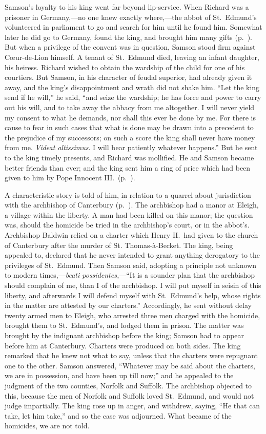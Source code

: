 \documentclass[10pt]{book}
\begin{document}
{Samson's loyalty to his king went far beyond lip-service. When Richard was a prisoner in Germany,---no one knew exactly where,---the abbot of St.\ Edmund's volunteered in parliament to go and search for him until he found him. Somewhat later he did go to Germany, found the king, and brought him many gifts (p.\ ). But when a privilege of the convent was in question, Samson stood firm against C\oe{}ur-de-Lion himself. A tenant of St.\ Edmund died, leaving an infant daughter, his heiress. Richard wished to obtain the wardship of the child for one of his courtiers. But Samson, in his character of feudal superior, had already given it away, and the king's disappointment and wrath did not shake him. ``Let the king send if he will,'' he said, ``and seize the wardship; he has force and power to carry out his will, and to take away the abbacy from me altogether. I will never yield my consent to what he demands, nor shall this ever be done by me. For there is cause to fear in such cases that what is done may be drawn into a precedent to the prejudice of my successors; on such a score the king shall never have money from me. \emph{Videat altissimus}. I will bear patiently whatever happens.'' But he sent to the king timely presents, and Richard was mollified. He and Samson became better friends than ever; and the king sent him a ring of price which had been given to him by Pope Innocent III.\ (p.\ ).

A characteristic story is told of him, in relation to a quarrel about jurisdiction with the archbishop of Canterbury (p.\ ). The archbishop had a manor at Eleigh, a village within the liberty. A man had been killed on this manor; the question was, should the homicide be tried in the archbishop's court, or in the abbot's. Archbishop Baldwin relied on a charter which Henry II.\ had given to the church of Canterbury after the murder of St. Thomas-à-Becket. The king, being appealed to, declared that he never intended to grant anything derogatory to the privileges of St.\ Edmund. Then Samson said, adopting a principle not unknown to modern times,---\emph{beati possidentes,}---``It is a sounder plan that the archbishop should complain of me, than I of the archbishop. I will put myself in seisin of this liberty, and afterwards I will defend myself with St.\ Edmund's help, whose rights in the matter are attested by our charters.'' Accordingly, he sent without delay twenty armed men to Eleigh, who arrested three men charged with the homicide, brought them to St.\ Edmund's, and lodged them in prison. The matter was brought by the indignant archbishop before the king; Samson had to appear before him at Canterbury. Charters were produced on both sides. The king remarked that he knew not what to say, unless that the charters were repugnant one to the other. Samson answered, ``Whatever may be said about the charters, we are in possession, and have been up till now;'' and he appealed to the judgment of the two counties, Norfolk and Suffolk. The archbishop objected to this, because the men of Norfolk and Suffolk loved St.\ Edmund, and would not judge impartially. The king rose up in anger, and withdrew, saying, ``He that can take, let him take,'' and so the case was adjourned. What became of the homicides, we are not told.

}
\end{document}
